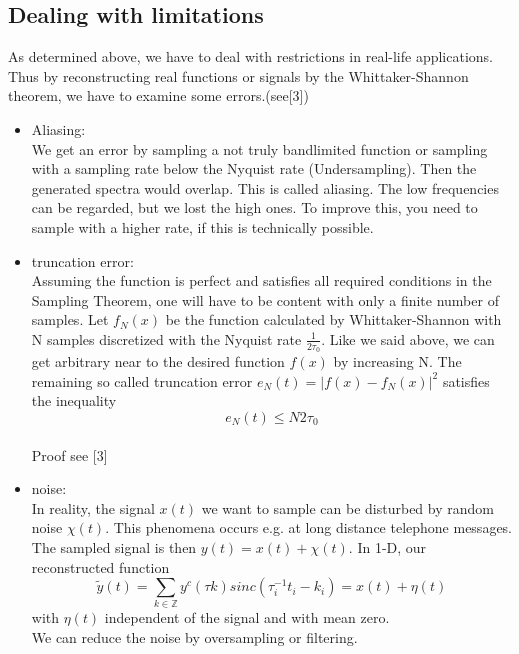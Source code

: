 \documentclass[a4paper, 11pt]{scrreprt}
\newcommand{\ZZ}{\mathbb{Z}}
\begin{document}
\subsection*{Dealing with limitations}
As determined above, we have to deal with restrictions in real-life applications.\\
Thus by reconstructing real functions or signals by the Whittaker-Shannon theorem, we have to examine some errors.(see[3])
\begin{itemize}
\item Aliasing:\\
We get an error by sampling a not truly bandlimited function or sampling with a sampling rate below the Nyquist rate (Undersampling). Then the generated spectra would overlap. This is called aliasing. The low frequencies can be regarded, but we lost the high ones. To improve this, you need to sample with a higher rate, if this is technically possible.\\

\item truncation error:\\
Assuming the function is perfect and satisfies all required conditions in the Sampling Theorem, one will have to be content with only a finite number of samples. Let $ f_N(x) $ be the function calculated by Whittaker-Shannon with N samples discretized with the Nyquist rate $ \frac{1}{2\tau_0} $. Like we said above, we can get arbitrary near to the desired function $f(x)$ by increasing N. The remaining so called truncation error $ e_N(t)=\vert f(x)-f_N(x)\vert^2 $ satisfies the inequality \[ e_N(t) \leq N2\tau_0\]\\
Proof see [3]

\item noise:\\
In reality, the signal $x(t) $ we want to sample can be disturbed by random noise $\chi(t)$. This phenomena occurs e.g. at long distance telephone messages.\\ 
The sampled signal is then $ y(t)=x(t)+\chi(t) $. In 1-D, our reconstructed function \[ \tilde{y}(t) = \sum_{k \in \ZZ} y^c(\tau k)  sinc\left(\tau_i^{-1} t_i -k_i\right)=x(t)+\eta(t) \] with $ \eta(t) $ independent of the signal and with mean zero.\\
We can reduce the noise by oversampling or filtering.
\end{itemize}


\nocite{marks02}
\nocite{fornasier03}



\end{document}
